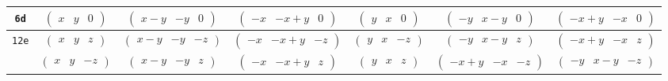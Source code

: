 \documentclass[fleqn,9pt,landscape]{jsarticle}
\begin{document}
\begin{center}
\begin{longtable}{ccccccc}
{\tt 6d} & $ \begin{pmatrix} x & y & 0 \end{pmatrix} $ & $ \begin{pmatrix} x - y & - y & 0 \end{pmatrix} $ & $ \begin{pmatrix} - x & - x + y & 0 \end{pmatrix} $ & $ \begin{pmatrix} y & x & 0 \end{pmatrix} $ & $ \begin{pmatrix} - y & x - y & 0 \end{pmatrix} $ & $ \begin{pmatrix} - x + y & - x & 0 \end{pmatrix} $ \\ \hline
{\tt 12e} & $ \begin{pmatrix} x & y & z \end{pmatrix} $ & $ \begin{pmatrix} x - y & - y & - z \end{pmatrix} $ & $ \begin{pmatrix} - x & - x + y & - z \end{pmatrix} $ & $ \begin{pmatrix} y & x & - z \end{pmatrix} $ & $ \begin{pmatrix} - y & x - y & z \end{pmatrix} $ & $ \begin{pmatrix} - x + y & - x & z \end{pmatrix} $ \\
& $ \begin{pmatrix} x & y & - z \end{pmatrix} $ & $ \begin{pmatrix} x - y & - y & z \end{pmatrix} $ & $ \begin{pmatrix} - x & - x + y & z \end{pmatrix} $ & $ \begin{pmatrix} y & x & z \end{pmatrix} $ & $ \begin{pmatrix} - x + y & - x & - z \end{pmatrix} $ & $ \begin{pmatrix} - y & x - y & - z \end{pmatrix} $ \\
\end{longtable}
\end{center}
\end{document}
